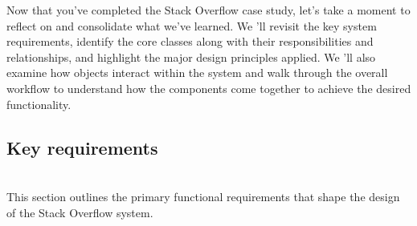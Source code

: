 

Now that you've completed the Stack Overflow case study, let's take a moment to reflect on and consolidate what we've learned. We 'll revisit the key system requirements, identify the core classes along with their responsibilities and relationships, and highlight the major design principles applied. We
'll also examine how objects interact within the system and walk through the overall workflow to understand how the components come together to achieve the desired functionality.

\subsection{Key requirements}\label{5HDz2lMHVkMrtFQWkqGN9}
\\
This section outlines the primary functional requirements that shape the design of the Stack Overflow system.

